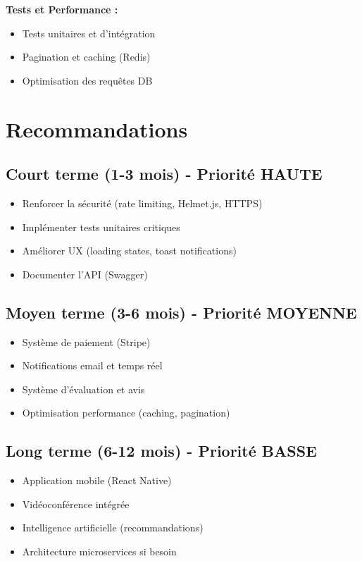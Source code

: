 \documentclass[12pt,a4paper]{article}
\begin{document}
\textbf{Tests et Performance :}
\begin{itemize}
    \item[$\square$] Tests unitaires et d'intégration
    \item[$\square$] Pagination et caching (Redis)
    \item[$\square$] Optimisation des requêtes DB
\end{itemize}

\section{Recommandations}

\subsection{Court terme (1-3 mois) - Priorité HAUTE}
\begin{itemize}
    \item Renforcer la sécurité (rate limiting, Helmet.js, HTTPS)
    \item Implémenter tests unitaires critiques
    \item Améliorer UX (loading states, toast notifications)
    \item Documenter l'API (Swagger)
\end{itemize}

\subsection{Moyen terme (3-6 mois) - Priorité MOYENNE}
\begin{itemize}
    \item Système de paiement (Stripe)
    \item Notifications email et temps réel
    \item Système d'évaluation et avis
    \item Optimisation performance (caching, pagination)
\end{itemize}

\subsection{Long terme (6-12 mois) - Priorité BASSE}
\begin{itemize}
    \item Application mobile (React Native)
    \item Vidéoconférence intégrée
    \item Intelligence artificielle (recommandations)
    \item Architecture microservices si besoin
\end{itemize}
\end{document}
